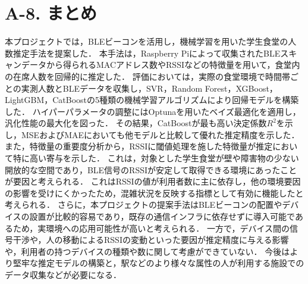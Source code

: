 \section*{A-8. まとめ}

本プロジェクトでは，BLEビーコンを活用し，機械学習を用いた学生食堂の人数推定手法を提案した．
本手法は，Raspberry Piによって収集されたBLEスキャンデータから得られるMACアドレス数やRSSIなどの特徴量を用いて，食堂内の在席人数を回帰的に推定した．
評価においては，実際の食堂環境で時間帯ごとの実測人数とBLEデータを収集し，SVR，Random Forest，XGBoost，LightGBM，CatBoostの5種類の機械学習アルゴリズムにより回帰モデルを構築した．
ハイパーパラメータの調整にはOptunaを用いたベイズ最適化を適用し，汎化性能の最大化を図った．
その結果，CatBoostが最も高い決定係数$R^2$を示し，MSEおよびMAEにおいても他モデルと比較して優れた推定精度を示した．
また，特徴量の重要度分析から，RSSIに閾値処理を施した特徴量が推定において特に高い寄与を示した．
これは，対象とした学生食堂が壁や障害物の少ない開放的な空間であり，BLE信号のRSSIが安定して取得できる環境にあったことが要因と考えられる．
これはRSSIの値が利用者数に主に依存し，他の環境要因の影響を受けにくかったため，混雑状況を反映する指標として有効に機能したと考えられる．
さらに，本プロジェクトの提案手法はBLEビーコンの配置やデバイスの設置が比較的容易であり，既存の通信インフラに依存せずに導入可能であるため，実環境への応用可能性が高いと考えられる．
一方で，デバイス間の信号干渉や，人の移動によるRSSIの変動といった要因が推定精度に与える影響や，利用者の持つデバイスの種類や数に関して考慮ができていない．
今後はより堅牢な推定モデルの構築と，駅などのより様々な属性の人が利用する施設でのデータ収集などが必要になる．
